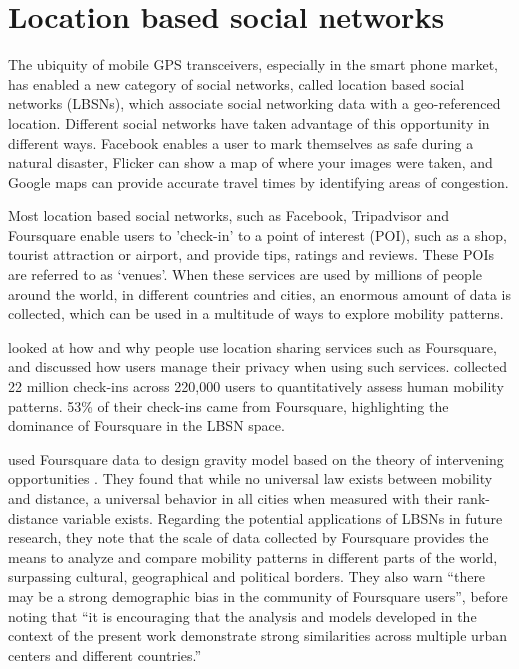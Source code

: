\section{Location based social networks}
The ubiquity of mobile GPS transceivers, especially in the smart phone market, has enabled a new category of social networks, called location based social networks (LBSNs), which associate social networking data with a geo-referenced location. Different social networks have taken advantage of this opportunity in different ways. Facebook enables a user to mark themselves as safe during a natural disaster, Flicker can show a map of where your images were taken, and Google maps can provide accurate travel times by identifying areas of congestion. 

Most location based social networks, such as Facebook, Tripadvisor and Foursquare enable users to 'check-in' to a point of interest (POI), such as a shop, tourist attraction or airport, and provide tips, ratings and reviews. These POIs are referred to as `venues'. When these services are used by millions of people around the world, in different countries and cities, an enormous amount of data is collected, which can be used in a multitude of ways to explore mobility patterns. 

\textcite{lindqvist2011m} looked at how and why people use location sharing services such as Foursquare, and discussed how users manage their privacy when using such services. \autocite{cheng2011exploring} collected 22 million check-ins across 220,000 users to quantitatively assess human mobility patterns. 53\% of their check-ins came from Foursquare, highlighting the dominance of Foursquare in the LBSN space.

\textcite{noulas2012tale} used Foursquare data to design gravity model based on the theory of intervening opportunities \parencite{stouffer1940intervening}. They found that while no universal law exists between mobility and distance, a universal behavior in all cities when measured with their rank-distance variable exists. Regarding the potential applications of LBSNs in future research, they note that the scale of data collected by Foursquare provides the means to analyze and compare mobility patterns in different parts of the world, surpassing cultural, geographical and political borders. They also warn \enquote{there may be a strong demographic bias in the community of Foursquare users}, before noting that \enquote{it is encouraging that the analysis and models developed in the context of the present work demonstrate strong similarities across multiple urban centers and different countries.}

